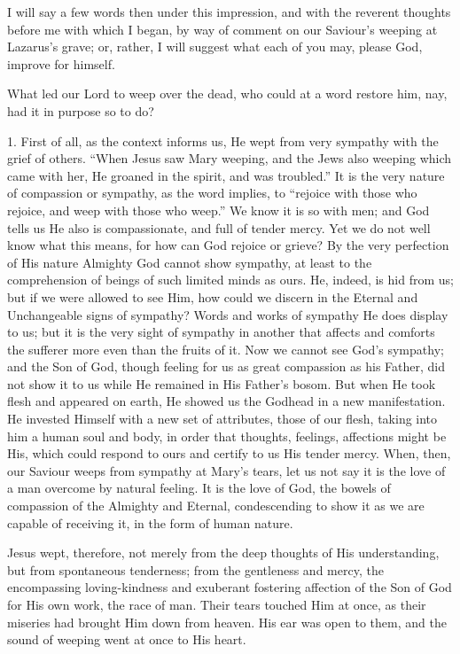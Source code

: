 I will say a few words then under this impression, and with the
reverent thoughts before me with which I began, by way of comment on
our Saviour's weeping at Lazarus's grave; or, rather, I will suggest
what each of you may, please God, improve for himself.

What led our Lord to weep over the dead, who could at a word
restore him, nay, had it in purpose so to do?

1. First of all, as the context informs us, He wept from very
sympathy with the grief of others. ``When Jesus saw Mary weeping,
and the Jews also weeping which came with her, He groaned in the
spirit, and was troubled.'' It is the very nature of compassion or
sympathy, as the word implies, to ``rejoice with those who
rejoice, and weep with those who weep.'' We know it is so with
men; and God tells us He also is compassionate, and full of tender
mercy. Yet we do not well know what this means, for how can God
rejoice or grieve? By the very perfection of His nature Almighty God
cannot show sympathy, at least to the comprehension of beings of such
limited minds as ours. He, indeed, is hid from us; but if we were
allowed to see Him, how could we discern in the Eternal and
Unchangeable signs of sympathy? Words and works of sympathy He does
display to us; but it is the very sight of sympathy in another that
affects and comforts the sufferer more even than the fruits of it. Now
we cannot see God's sympathy; and the Son of God, though feeling for
us as great compassion as his Father, did not show it to us while He
remained in His Father's bosom. But when He took flesh and appeared on
earth, He showed us the Godhead in a new manifestation. He invested
Himself with a new set of attributes, those of our flesh, taking into
him a human soul and body, in order that thoughts, feelings,
affections might be His, which could respond to ours and certify to us
His tender mercy. When, then, our Saviour weeps from sympathy at
Mary's tears, let us not say it is the love of a man overcome by
natural feeling. It is the love of God, the bowels of compassion of
the Almighty and Eternal, condescending to show it as we are capable
of receiving it, in the form of human nature.

Jesus wept, therefore, not merely from the deep thoughts of His
understanding, but from spontaneous tenderness; from the gentleness
and mercy, the encompassing loving-kindness and exuberant fostering
affection of the Son of God for His own work, the race of man. Their
tears touched Him at once, as their miseries had brought Him down from
heaven. His ear was open to them, and the sound of weeping went at
once to His heart.


